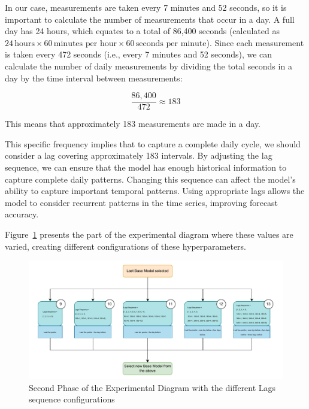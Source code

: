 In our case, measurements are taken every 7 minutes and 52 seconds, so it is important to calculate the number of measurements that occur in a day. A full day has 24 hours, which equates to a total of 86,400 seconds (calculated as \(24 \, \text{hours} \times 60 \, \text{minutes per hour} \times 60 \, \text{seconds per minute}\)). Since each measurement is taken every 472 seconds (i.e., every 7 minutes and 52 seconds), we can calculate the number of daily measurements by dividing the total seconds in a day by the time interval between measurements: 

\[
\frac{86,400}{472} \approx 183
\]

This means that approximately 183 measurements are made in a day.

This specific frequency implies that to capture a complete daily cycle, we should consider a lag covering approximately 183 intervals. By adjusting the lag sequence, we can ensure that the model has enough historical information to capture complete daily patterns. Changing this sequence can affect the model's ability to capture important temporal patterns. Using appropriate lags allows the model to consider recurrent patterns in the time series, improving forecast accuracy.

Figure~\ref{D2} presents the part of the experimental diagram where these values are varied, creating different configurations of these hyperparameters.

\begin{figure}[htbp]
    \centering
    \includegraphics[width=15 cm]{5_ChapterDesign/figuras/Diagrams/D2.pdf}
    \caption{Second Phase of the Experimental Diagram with the different Lags sequence configurations}
    \label{D2}
\end{figure}

